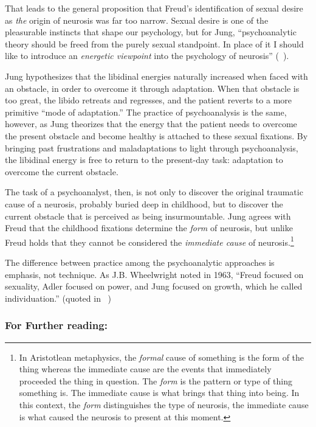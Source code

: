 \begin{refsection}
That leads to the general proposition that Freud's identification of sexual desire as \emph{the} origin of neurosis was far too narrow. Sexual desire is one of the pleasurable instincts that shape our psychology, but for Jung, “psychoanalytic theory should be freed from the purely sexual standpoint. In place of it I should like to introduce an \emph{energetic viewpoint} into the psychology of neurosis” (~\citep[p. 50]{Jung:ss-xAx6i}).

Jung hypothesizes that the libidinal energies naturally increased when faced with an obstacle, in order to overcome it through adaptation. When that obstacle is too great, the libido retreats and regresses, and the patient reverts to a more primitive “mode of adaptation.” The practice of psychoanalysis is the same, however, as Jung theorizes that the energy that the patient needs to overcome the present obstacle and become healthy is attached to these sexual fixations. By bringing past frustrations and maladaptations to light through psychoanalysis, the libidinal energy is free to return to the present-day task: adaptation to overcome the current obstacle.

The task of a psychoanalyst, then, is not only to discover the original traumatic cause of a neurosis, probably buried deep in childhood, but to discover the current obstacle that is perceived as being insurmountable. Jung agrees with Freud that the childhood fixations determine the \emph{form} of neurosis, but unlike Freud holds that they cannot be considered the \emph{immediate cause} of neurosis.\footnote{In Aristotlean metaphysics, the \emph{formal} cause of something is the form of the thing whereas the immediate cause are the events that immediately proceeded the thing in question. The \emph{form} is the pattern or type of thing something is. The immediate cause is what brings that thing into being. In this context, the \emph{form} distinguishes the type of neurosis, the immediate cause is what caused the neurosis to present at this moment.}

The difference between practice among the psychoanalytic approaches is emphasis, not technique. As J.B. Wheelwright noted in 1963, “Freud focused on sexuality, Adler focused on power, and Jung focused on growth, which he called individuation.” (quoted in ~\citep[p. 817]{Arieti:1974tm})

\subsubsection{For Further reading:}
\label{forfurtherreading:}


\end{refsection}
